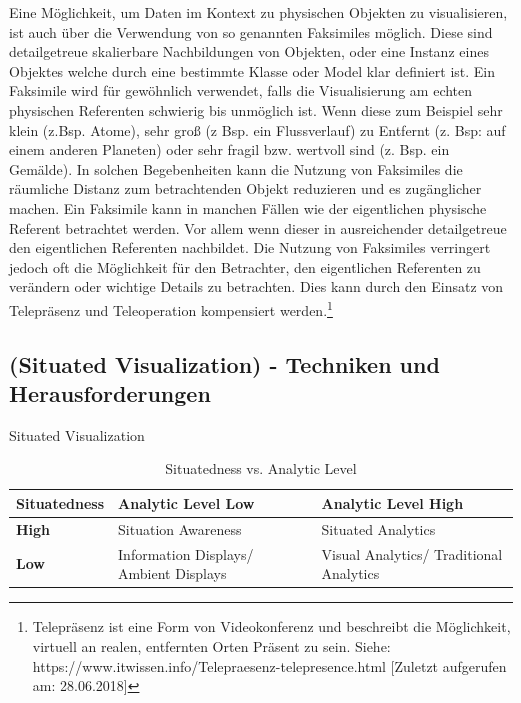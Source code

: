 \cite{WesleyWillettYvonneJansen}Eine Möglichkeit, um Daten im Kontext zu physischen Objekten zu visualisieren, ist auch über die Verwendung von so genannten Faksimiles möglich. Diese sind detailgetreue skalierbare Nachbildungen von Objekten, oder eine Instanz eines Objektes welche durch eine bestimmte Klasse oder Model klar definiert ist. Ein Faksimile wird für gewöhnlich verwendet, falls die Visualisierung am echten physischen Referenten schwierig bis unmöglich ist. Wenn diese zum Beispiel sehr klein (z.Bsp. Atome), sehr groß (z Bsp. ein Flussverlauf) zu Entfernt (z. Bsp: auf einem anderen Planeten) oder sehr fragil bzw. wertvoll sind
(z. Bsp. ein Gemälde). 
In solchen Begebenheiten kann die Nutzung von Faksimiles die räumliche Distanz zum betrachtenden Objekt
reduzieren und es zugänglicher machen. Ein Faksimile kann in manchen Fällen wie der eigentlichen physische Referent betrachtet werden. Vor allem wenn dieser in ausreichender detailgetreue den eigentlichen Referenten nachbildet. Die Nutzung von Faksimiles verringert jedoch oft die Möglichkeit für den Betrachter, den eigentlichen Referenten zu verändern oder wichtige Details zu betrachten. Dies kann durch den Einsatz von Telepräsenz und Teleoperation kompensiert werden.\footnote{Telepräsenz ist eine Form von Videokonferenz und beschreibt die Möglichkeit, virtuell an realen, entfernten Orten Präsent zu sein. Siehe: https://www.itwissen.info/Telepraesenz-telepresence.html [Zuletzt aufgerufen am: 28.06.2018]}

\subsection{(Situated Visualization) - Techniken und Herausforderungen}
Situated Visualization 



\begin{table}[htbp]
	\caption{Situatedness vs. Analytic Level}
	\begin{center}
		\begin{tabular}{|l|l|l|}
			\hline
			\textbf{Situatedness}& \textbf{Analytic Level Low} & \textbf{Analytic Level High}\\
			\hline
			\textbf{High } & Situation Awareness & Situated Analytics \\
			\hline
			\textbf{Low} & Information Displays/ Ambient Displays & Visual Analytics/ Traditional Analytics \\
			\hline
		\end{tabular}
	\end{center}
	\label{tab:categorycscw}
\end{table}


